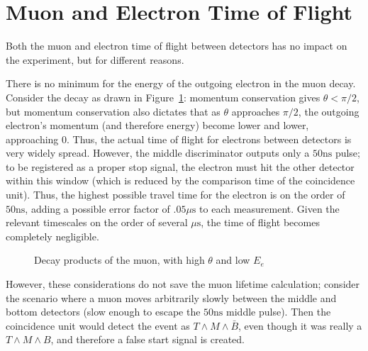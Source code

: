 \section{Muon and Electron Time of Flight}

Both the muon and electron time of flight between detectors has no impact on the experiment, but for different reasons.

There is no minimum for the energy of the outgoing electron in the muon decay. Consider the decay as drawn in Figure~\ref{figure:electronpi}: momentum conservation gives $\theta < \pi/2$, but momentum conservation also dictates that as $\theta$ approaches $\pi/2$, the outgoing electron's momentum (and therefore energy) become lower and lower, approaching $0$. Thus, the actual time of flight for electrons between detectors is very widely spread. However, the middle discriminator outputs only a $50 \mathrm{ns}$ pulse; to be registered as a proper stop signal, the electron must hit the other detector within this window (which is reduced by the comparison time of the coincidence unit). Thus, the highest possible travel time for the electron is on the order of $50 \mathrm{ns}$, adding a possible error factor of $.05 \mu\mathrm{s}$ to each measurement. Given the relevant timescales on the order of several $\mu\mathrm{s}$, the time of flight becomes completely negligible.

\begin{figure}[htbp]
\begin{center}
 

 
\caption{\small{Decay products of the muon, with high $\theta$ and low $E_{e}$}}
\label{figure:electronpi}
\end{center}
\end{figure}

However, these considerations do not save the muon lifetime calculation; consider the scenario where a muon moves arbitrarily slowly between the middle and bottom detectors (slow enough to escape the $50 \mathrm{ns}$ middle pulse). Then the coincidence unit would detect the event as $T \wedge M \wedge \bar{B}$, even though it was really a $T \wedge M \wedge B$, and therefore a false start signal is created.


